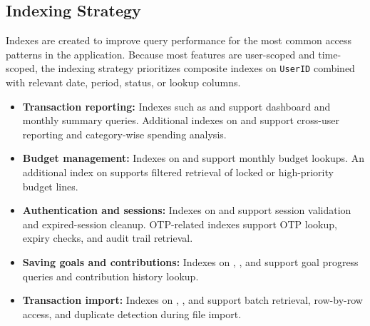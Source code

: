 \documentclass{article}
\begin{document}
\subsection{Indexing Strategy}

Indexes are created to improve query performance for the most common access patterns in the application. 
Because most features are user-scoped and time-scoped, the indexing strategy prioritizes composite 
indexes on \texttt{UserID} combined with relevant date, period, status, or lookup columns.

\begin{itemize}
    \item \textbf{Transaction reporting:} 
    Indexes such as  and 
     support dashboard and monthly summary queries. 
    Additional indexes on  and 
     support cross-user reporting and category-wise 
    spending analysis.

    \item \textbf{Budget management:} 
    Indexes on  and 
     support monthly budget lookups. 
    An additional index on  
    supports filtered retrieval of locked or high-priority budget lines.

    \item \textbf{Authentication and sessions:} 
    Indexes on  and 
     support session validation and expired-session cleanup. 
    OTP-related indexes support OTP lookup, expiry checks, and audit trail retrieval.

    \item \textbf{Saving goals and contributions:} 
    Indexes on , , 
    and  support goal progress queries and 
    contribution history lookup.

    \item \textbf{Transaction import:} 
    Indexes on , 
    , and 
     support batch retrieval, row-by-row access, 
    and duplicate detection during file import.
\end{itemize}
\end{document}
